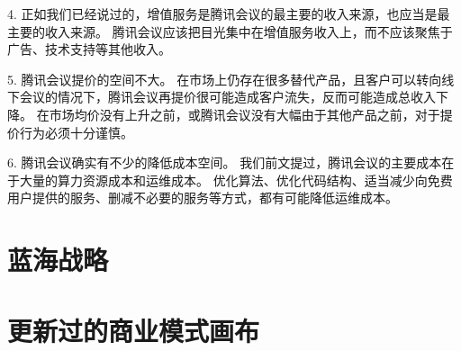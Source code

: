 \documentclass[a4paper,12pt]{article}
\begin{document}
    4.
    正如我们已经说过的，增值服务是腾讯会议的最主要的收入来源，也应当是最主要的收入来源。
    腾讯会议应该把目光集中在增值服务收入上，而不应该聚焦于广告、技术支持等其他收入。


    5.
    腾讯会议提价的空间不大。
    在市场上仍存在很多替代产品，且客户可以转向线下会议的情况下，腾讯会议再提价很可能造成客户流失，反而可能造成总收入下降。
    在市场均价没有上升之前，或腾讯会议没有大幅由于其他产品之前，对于提价行为必须十分谨慎。

    6.
    腾讯会议确实有不少的降低成本空间。
    我们前文提过，腾讯会议的主要成本在于大量的算力资源成本和运维成本。
    优化算法、优化代码结构、适当减少向免费用户提供的服务、删减不必要的服务等方式，都有可能降低运维成本。

    \section{蓝海战略}
    

\section{更新过的商业模式画布}


    
\end{document}
